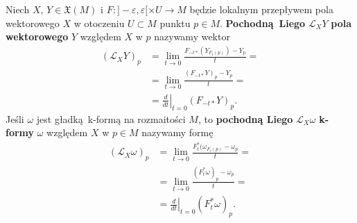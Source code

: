 Niech \(X,\,Y\in\mathfrak{X}(M)\) i \(F:]-\varepsilon, \varepsilon[\times U\rightarrow M\) będzie lokalnym przepływem pola wektorowego \(X\) w otoczeniu \(U\subset M\) punktu \(p\in M\). \textbf{Pochodną Liego} \(\mathcal{L}_X Y\) \textbf{pola wektorowego} \(Y\) względem \(X\) w \(p\) nazywamy wektor
\begin{equation}\label{eq:lie_vector}
\begin{split}
(\mathcal{L}_X Y)_p &= \lim_{t\to 0} \frac{F_{-t\ast}(Y_{F_t(p)})-Y_p}{t} =\\
                    &= \lim_{t\to 0} \frac{(F_{-t\ast}Y)_p - Y_p}{t} =\\
                    &= \left.\frac{d}{dt}\right|_{t = 0}(F_{-t\ast}Y)_p.
\end{split}
\end{equation} 
Jeśli \(\omega\) jest gładką k-formą na rozmaitości \(M\), to \textbf{pochodną Liego} \(\mathcal{L}_X \omega\) \textbf{k-formy} \(\omega\) względem \(X\) w \(p\in M\) nazywamy formę
\begin{equation}\label{eq:lie_form}
\begin{split}
(\mathcal{L}_X \omega)_p &= \lim_{t\to 0}\frac{F_t^{\ast}(\omega_{F_t(p)}-\omega_p}{t} =\\
						 &= \lim_{t\to 0}\frac{(F_t^{\ast}\omega)_p - \omega_p}{t} =\\
						 &= \left.\frac{d}{dt}\right|_{t=0}(F_t^{\ast}\omega)_p.
\end{split}
\end{equation}

